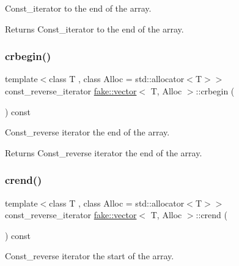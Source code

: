 Const\+\_\+iterator to the end of the array. 

\begin{DoxyReturn}{Returns}
Const\+\_\+iterator to the end of the array. 
\end{DoxyReturn}
\mbox{\label{classfake_1_1vector_af8134189dd3977bd4037a10e6854ac9c}} 
\subsubsection{\texorpdfstring{crbegin()}{crbegin()}}
{\footnotesize\ttfamily template$<$class T , class Alloc  = std\+::allocator$<$\+T$>$$>$ \\
const\+\_\+reverse\+\_\+iterator \mbox{\hyperlink{classfake_1_1vector}{fake\+::vector}}$<$ T, Alloc $>$\+::crbegin (\begin{DoxyParamCaption}{ }\end{DoxyParamCaption}) const\hspace{0.3cm}{\ttfamily [inline]}}



Const\+\_\+reverse iterator the end of the array. 

\begin{DoxyReturn}{Returns}
Const\+\_\+reverse iterator the end of the array. 
\end{DoxyReturn}
\mbox{\label{classfake_1_1vector_adf391e72aed746a40ac380aaf70a32d8}} 
\subsubsection{\texorpdfstring{crend()}{crend()}}
{\footnotesize\ttfamily template$<$class T , class Alloc  = std\+::allocator$<$\+T$>$$>$ \\
const\+\_\+reverse\+\_\+iterator \mbox{\hyperlink{classfake_1_1vector}{fake\+::vector}}$<$ T, Alloc $>$\+::crend (\begin{DoxyParamCaption}{ }\end{DoxyParamCaption}) const\hspace{0.3cm}{\ttfamily [inline]}}



Const\+\_\+reverse iterator the start of the array. 

